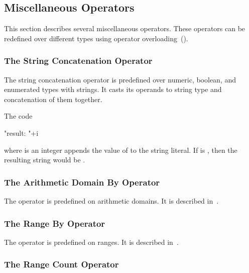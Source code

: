 \subsection{Miscellaneous Operators}
\label{Miscellaneous_Operators}

This section describes several miscellaneous operators.  These
operators can be redefined over different types using operator
overloading~().

\subsubsection{The String Concatenation Operator}
\label{The_String_Concatenation_Operator}

The string concatenation operator \chpl{+} is predefined over numeric, boolean,
and enumerated types with strings. It casts its operands to string type and
concatenation of them together.

\begin{example}
The code
\begin{chapel}
"result: "+i
\end{chapel}
where  is an integer appends the value of  to the
string literal.  If  is , then the resulting string
would be .
\end{example}

\subsubsection{The Arithmetic Domain By Operator}
\label{The_Arithmetic_Domain_By_Operator}

The operator  is predefined on arithmetic domains.  It is
described in~.

\subsubsection{The Range By Operator}
\label{The_Range_By_Operator}

The operator  is predefined on ranges.  It is
described in~.

\subsubsection{The Range Count Operator}
\label{The_Range_Count_Operator}

